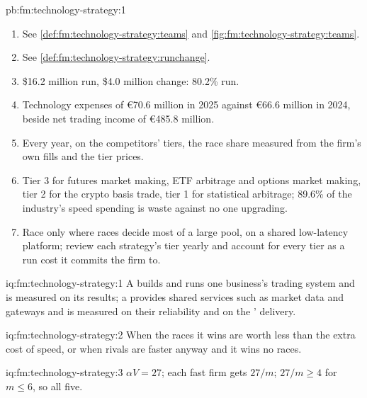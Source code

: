 \begin{solution}{pb:fm:technology-strategy:1}
\begin{enumerate}
wasteful race; they propose frequent batch auctions.
\item See \cref{def:fm:technology-strategy:teams} and \cref{fig:fm:technology-strategy:teams}.
\item See \cref{def:fm:technology-strategy:runchange}.
\item \$16.2 million run, \$4.0 million change: 80.2\% run.
\item Technology expenses of \euro70.6 million in 2025 against \euro66.6 million in 2024, beside net trading income of \euro485.8 million.
\item Every year, on the competitors' tiers, the race share measured from the firm's own fills and the tier prices.
\item Tier 3 for futures market making, ETF arbitrage and options market making, tier 2 for the crypto basis trade, tier 1 for statistical
arbitrage; 89.6\% of the industry's speed spending is waste against no one upgrading.
\item Race only where races decide most of a large pool, on a shared low-latency platform; review each strategy's tier yearly and account for every
tier as a run cost it commits the firm to.
\end{enumerate}
\end{solution}

\begin{solution}{iq:fm:technology-strategy:1}
A  builds and runs one business's trading system and is measured on its results; a  provides shared services such as
market data and gateways and is measured on their reliability and on the ' delivery.
\end{solution}

\begin{solution}{iq:fm:technology-strategy:2}
When the races it wins are worth less than the extra cost of speed, or when rivals are faster anyway and it wins no races.
\end{solution}

\begin{solution}{iq:fm:technology-strategy:3}
$\alpha V=27$; each fast firm gets $27/m$; $27/m\ge4$ for $m\le6$, so all five.
\end{solution}

